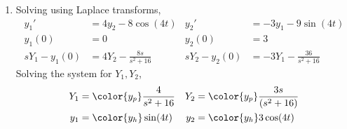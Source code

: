 \begin{enumerate}
    \item Solving using Laplace transforms,
          \begin{align}
              y_1'          & = 4y_2 - 8\cos(4t)            &
              y_2'          & = -3y_1 - 9\sin(4t)             \\
              y_1(0)        & = 0                           &
              y_2(0)        & = 3                             \\
              sY_1 - y_1(0) & = 4Y_2 - \frac{8s}{s^2 + 16}  &
              sY_2 - y_2(0) & = -3Y_1 - \frac{36}{s^2 + 16}
          \end{align}
          Solving the system for $ Y_1, Y_2 $,
          \begin{align}
              Y_1 & = \color{y_p} \frac{4}{s^2 + 16}    &
              Y_2 & = \color{y_p} \frac{3s}{(s^2 + 16)}   \\
              y_1 & = \color{y_h} \sin(4t)              &
              y_2 & = \color{y_h} 3\cos(4t)
          \end{align}


\end{enumerate}
